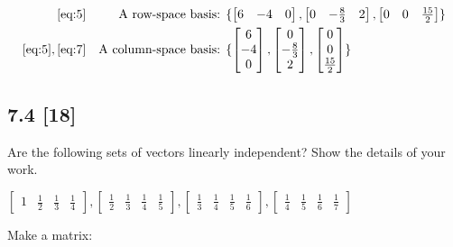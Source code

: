 \documentclass{article}
\begin{document}
\begin{align}
    \label{eq:9}
    \eqref{eq:5} && \text{A row-space basis} &\text{: } \{ \begin{bmatrix}6&-4&0\end{bmatrix}, \begin{bmatrix}0&-\frac{8}{3}&2\end{bmatrix}, \begin{bmatrix}0&0&\frac{15}{2}\end{bmatrix}\}
    \\
    \label{eq:10}
    \eqref{eq:5}, \eqref{eq:7} && \text{A column-space basis} &\text{: } \{
    \begin{bmatrix}6\\-4\\0\end{bmatrix}, \begin{bmatrix}
    0\\-\frac{8}{3}\\2
    \end{bmatrix}, \begin{bmatrix}
    0\\0\\\frac{15}{2}
    \end{bmatrix}\}
\end{align}

\subsection*{7.4 [18]}
\setcounter{equation}{0}

Are the following sets of vectors linearly independent?  Show the details of your work.

$ \begin{bmatrix}1&\frac{1}{2}&\frac{1}{3}&\frac{1}{4}\end{bmatrix}, \begin{bmatrix}
\frac{1}{2}&\frac{1}{3}&\frac{1}{4}&\frac{1}{5}
\end{bmatrix}, \begin{bmatrix}
\frac{1}{3}&\frac{1}{4}&\frac{1}{5}&\frac{1}{6}
\end{bmatrix}, \begin{bmatrix}
\frac{1}{4}&\frac{1}{5}&\frac{1}{6}&\frac{1}{7}
\end{bmatrix}$

Make a matrix:
\end{document}
